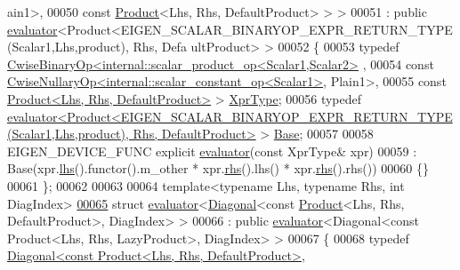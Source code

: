 \begin{DoxyCode}
      ain1>,
00050                                const \hyperlink{group___core___module_class_eigen_1_1_product}{Product}<Lhs, Rhs, DefaultProduct> > >
00051  : \textcolor{keyword}{public} \hyperlink{struct_eigen_1_1internal_1_1evaluator}{evaluator}<Product<EIGEN\_SCALAR\_BINARYOP\_EXPR\_RETURN\_TYPE(Scalar1,Lhs,product), Rhs, Defa
      ultProduct> >
00052 \{
00053   \textcolor{keyword}{typedef} \hyperlink{group___core___module_class_eigen_1_1_cwise_binary_op}{CwiseBinaryOp<internal::scalar\_product\_op<Scalar1,Scalar2>}
      ,
00054                                \textcolor{keyword}{const} 
      \hyperlink{group___core___module_class_eigen_1_1_cwise_nullary_op}{CwiseNullaryOp<internal::scalar\_constant\_op<Scalar1>}, 
      Plain1>,
00055                                \textcolor{keyword}{const} \hyperlink{group___core___module_class_eigen_1_1_product}{Product<Lhs, Rhs, DefaultProduct>} > 
      \hyperlink{group___core___module_class_eigen_1_1_cwise_binary_op}{XprType};
00056   \textcolor{keyword}{typedef} 
      \hyperlink{struct_eigen_1_1internal_1_1evaluator}{evaluator<Product<EIGEN\_SCALAR\_BINARYOP\_EXPR\_RETURN\_TYPE(Scalar1,Lhs,product), Rhs, DefaultProduct>}
       > \hyperlink{struct_eigen_1_1internal_1_1evaluator}{Base};
00057 
00058   EIGEN\_DEVICE\_FUNC \textcolor{keyword}{explicit} \hyperlink{struct_eigen_1_1internal_1_1evaluator}{evaluator}(\textcolor{keyword}{const} XprType& xpr)
00059     : Base(xpr.\hyperlink{group___core___module_a0f73e7585dfb54d41c1983e1e6a4b269}{lhs}().functor().m\_other * xpr.\hyperlink{group___core___module_a3a61cbdf6d1adaa62f012045b04b6d09}{rhs}().lhs() * xpr.\hyperlink{group___core___module_a3a61cbdf6d1adaa62f012045b04b6d09}{rhs}().rhs())
00060   \{\}
00061 \};
00062 
00063 
00064 \textcolor{keyword}{template}<\textcolor{keyword}{typename} Lhs, \textcolor{keyword}{typename} Rhs, \textcolor{keywordtype}{int} DiagIndex>
\hyperlink{struct_eigen_1_1internal_1_1evaluator_3_01_diagonal_3_01const_01_product_3_01_lhs_00_01_rhs_00_0f2daf8d0d705abfd9eae463424f3e8d5}{00065} \textcolor{keyword}{struct }\hyperlink{struct_eigen_1_1internal_1_1evaluator}{evaluator}<\hyperlink{group___core___module_class_eigen_1_1_diagonal}{Diagonal}<const \hyperlink{group___core___module_class_eigen_1_1_product}{Product}<Lhs, Rhs, DefaultProduct>, DiagIndex> > 
00066  : \textcolor{keyword}{public} \hyperlink{struct_eigen_1_1internal_1_1evaluator}{evaluator}<Diagonal<const Product<Lhs, Rhs, LazyProduct>, DiagIndex> >
00067 \{
00068   \textcolor{keyword}{typedef} \hyperlink{group___core___module_class_eigen_1_1_diagonal}{Diagonal<const Product<Lhs, Rhs, DefaultProduct>},

\end{DoxyCode}
